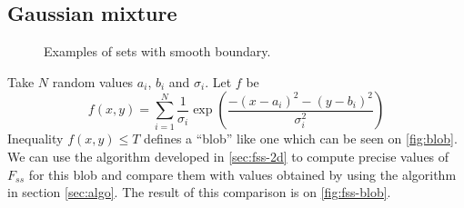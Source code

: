 \documentclass[reprint,amsmath,amssymb,aps,pre,showkeys,showpacs]{revtex4-1}
\begin{document}
\subsection{Gaussian mixture}
\label{sec:gauss}
\begin{figure}[!hpt]
  \centering
  \hfill
  \caption[]{Examples of sets with smooth boundary.}
\end{figure}
Take $N$ random values $a_i$, $b_i$ and $\sigma_i$. Let $f$ be
\begin{equation*}
  f(x,y) = \sum_{i=1}^N \frac{1}{\sigma_i} \exp(\frac{-(x-a_i)^2-(y-b_i)^2}{\sigma_i^2})
\end{equation*}
Inequality $f(x,y) \le T$ defines a ``blob'' like one which can be seen on
\cref{fig:blob}. We can use the algorithm developed in \cref{sec:fss-2d} to
compute precise values of $F_{ss}$ for this blob and compare them with values
obtained by using the algorithm in section \cref{sec:algo}. The result of this
comparison is on \cref{fig:fss-blob}.
\end{document}
